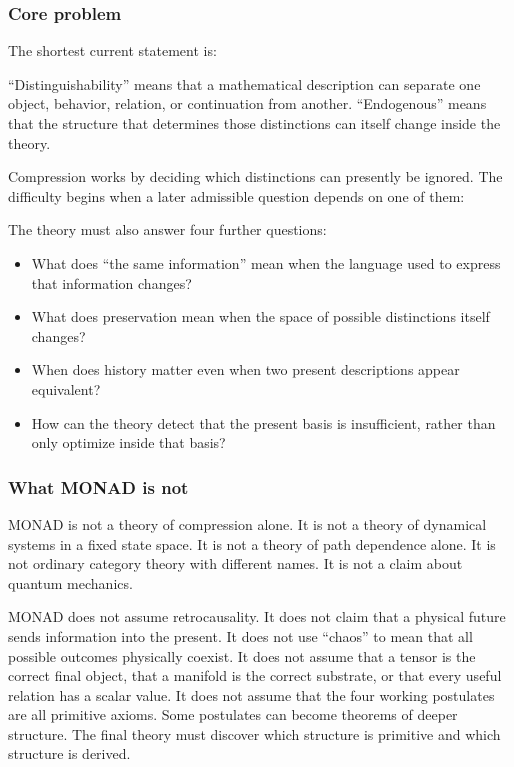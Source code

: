 \subsubsection{Core problem}

The shortest current statement is:


``Distinguishability'' means that a mathematical description can
separate one object, behavior, relation, or continuation from
another. ``Endogenous'' means that the structure that determines those
distinctions can itself change inside the theory.

Compression works by deciding which distinctions can presently be
ignored. The difficulty begins when a later admissible question
depends on one of them:


The theory must also answer four further questions:
\begin{itemize}
  \item What does ``the same information'' mean when the language
    used to express that information changes?
  \item What does preservation mean when the space of possible
    distinctions itself changes?
  \item When does history matter even when two present descriptions
    appear equivalent?
  \item How can the theory detect that the present basis is
    insufficient, rather than only optimize inside that basis?
\end{itemize}

\subsubsection{What MONAD is not}

MONAD is not a theory of compression alone. It is not a theory of
dynamical systems in a fixed state space. It is not a theory of path
dependence alone. It is not ordinary category theory with different
names. It is not a claim about quantum mechanics.

MONAD does not assume retrocausality. It does not claim that a
physical future sends information into the present. It does not use
``chaos'' to mean that all possible outcomes physically coexist. It
does not assume that a tensor is the correct final object, that a
manifold is the correct substrate, or that every useful relation has a
scalar value. It does not assume that the four working postulates are
all primitive axioms. Some postulates can become theorems of deeper
structure. The final theory must discover which structure is primitive
and which structure is derived.

